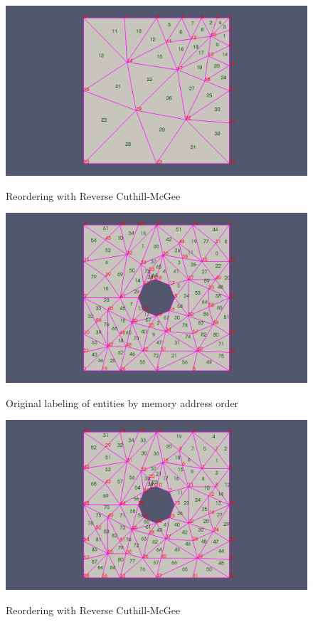\documentclass{article}
\begin{document}
\begin{figure}[h]
\caption{Reordering with Reverse Cuthill-McGee}
{\includegraphics[width = 15cm ]{post_b}}
\centering
\end{figure}

\begin{figure}[ht]
\caption{Original labeling of entities by memory address order}
{\includegraphics[width = 15cm ]{pre_c}}
\centering
\end{figure}

\begin{figure}[h]
\caption{Reordering with Reverse Cuthill-McGee}
{\includegraphics[width = 15cm ]{post_c}}
\centering
\end{figure}
\end{document}
